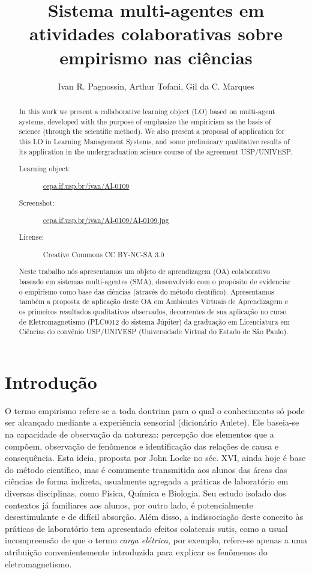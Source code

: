 \documentclass[a0,portrait]{a0poster}
\title{Sistema multi-agentes em atividades colaborativas sobre empirismo nas ciências}
\author{Ivan R. Pagnossin\inst{1}, Arthur Tofani\inst{1}, Gil da C. Marques\inst{1}}
\begin{document}
\maketitle

\begin{abstract}
In this work we present a collaborative learning object (LO) based on multi-agent systems,
developed with the purpose of emphasize the empiricism as the basis of science (through the scientific method).
We also present a proposal of application for this LO in Learning Management Systems,
and some preliminary qualitative results of its application in the undergraduation science course of the agreement USP/UNIVESP.

\begin{description}
\item[Learning object:] \url{cepa.if.usp.br/ivan/AI-0109}
\item[Screenshot:] \url{cepa.if.usp.br/ivan/AI-0109/AI-0109.jpg}
\item[License:] Creative Commons CC BY-NC-SA 3.0
\end{description}
\end{abstract}

\begin{abstract}
Neste trabalho nós apresentamos um objeto de aprendizagem (OA) colaborativo baseado em sistemas multi-agentes (SMA),
desenvolvido com o propósito de evidenciar o empirismo como base das ciências (através do método científico).
Apresentamos também a proposta de aplicação deste OA em Ambientes Virtuais de Aprendizagem e os primeiros resultados qualitativos
observados, decorrentes de sua aplicação no curso de Eletromagnetismo (PLC0012 do sistema Júpiter) da graduação em
Licenciatura em Ciências do convênio USP/UNIVESP (Universidade Virtual do Estado de São Paulo).
\end{abstract}

\section{Introdução}

O termo empirismo refere-se a toda doutrina para o qual o conhecimento só pode
ser alcançado mediante a experiência sensorial (dicionário Aulete). Ele baseia-se
na capacidade de observação da natureza: percepção dos elementos que a compõem,
observação de fenômenos e identificação das relações de causa e consequência. Esta
ideia, proposta por John Locke no séc. XVI, ainda hoje é base do método científico,
mas é comumente transmitida aos alunos das áreas das ciências de forma indireta,
usualmente agregada a práticas de laboratório em diversas disciplinas, como Física,
Química e Biologia. Seu estudo isolado dos contextos já familiares aos alunos, por outro
lado, é potencialmente desestimulante e de difícil absorção. Além disso, a indissociação
deste conceito às práticas de laboratório tem apresentado efeitos colaterais sutis,
como a usual incompreensão de que o termo \emph{carga elétrica}, por exemplo, refere-se
apenas a uma atribuição convenientemente introduzida para explicar os fenômenos do
eletromagnetismo.
\end{document}
